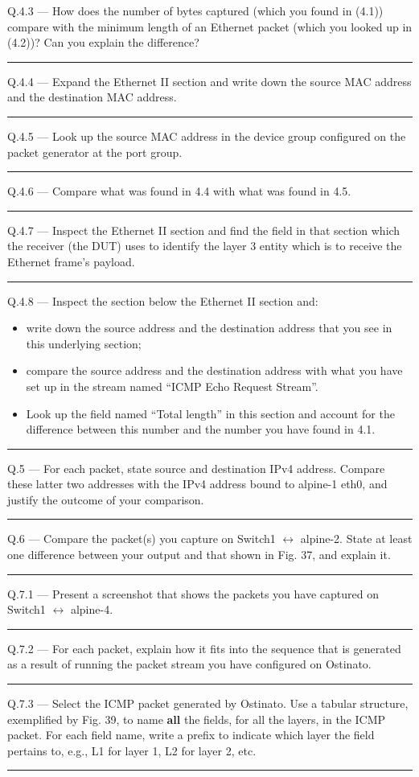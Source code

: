 \documentclass{article}
\newcommand\Que[2]{%
   \begin{samepage}
   \leavevmode\par
   \noindent
   Q.#1 --- #2\par\vspace{10pt}\hrule\vspace{10pt}
   \end{samepage}}
\begin{document}
\Que{4.3}{How does the number of bytes captured (which you found
in (4.1)) compare with the minimum length of an Ethernet packet
(which you looked up in (4.2))? Can you explain the difference?}

\Que{4.4}{Expand the Ethernet II section and write down the
source MAC address and the destination MAC address.}

\Que{4.5}{Look up the source MAC address in the device group
configured on the packet generator at the port group.}

\Que{4.6}{Compare what was found in 4.4 with what was found in
4.5.}

\Que{4.7}{Inspect the Ethernet II section and find the field in
that section which the receiver (the DUT) uses to identify the
layer 3 entity which is to receive the Ethernet frame's
payload.}

\Que{4.8}{Inspect the section below the Ethernet II section and:
\begin{itemize}
\item write down the source address and the destination address
   that you see in this underlying section;
\item compare the source address and the destination address
   with what you have set up in the stream named ``ICMP Echo
   Request Stream''.
\item Look up the field named ``Total length'' in this section
   and account for the difference between this number and the
   number you have found in 4.1.
\end{itemize}}


\Que{5}{For each packet, state source and destination IPv4
address. Compare these latter two addresses with the IPv4
address bound to alpine-1 eth0, and justify the outcome of your
comparison.}

\Que{6}{Compare the packet(s) you capture on Switch1
$\leftrightarrow$ alpine-2. State at least one difference
between your output and that shown in Fig. 37, and explain it.}


\Que{7.1}{Present a screenshot that shows the packets you have
captured on Switch1 $\leftrightarrow$ alpine-4.}


\Que{7.2}{For each packet, explain how it fits into the sequence that is generated as a result of running the
packet stream you have configured on Ostinato.}

\Que{7.3}{Select the ICMP packet generated by Ostinato. Use a
   tabular structure, exemplified by Fig. 39, to name
   \textbf{all} the fields, for all the layers, in the ICMP
   packet. For each field name, write a prefix to indicate which
layer the field pertains to, e.g., L1 for layer 1, L2 for layer
2, etc.}
\end{document}
